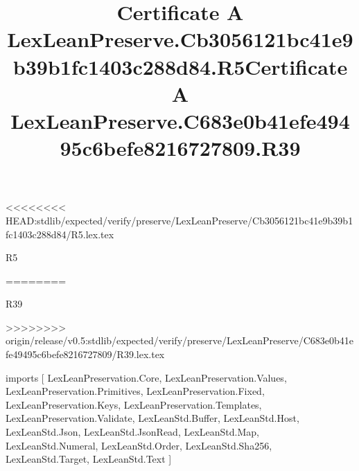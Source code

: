 <<<<<<<< HEAD:stdlib/expected/verify/preserve/LexLeanPreserve/Cb3056121bc41e9b39b1fc1403c288d84/R5.lex.tex
\begin{lexlean}{R5}
\title{Certificate A LexLeanPreserve.Cb3056121bc41e9b39b1fc1403c288d84.R5}
========
\begin{lexlean}{R39}
\title{Certificate A LexLeanPreserve.C683e0b41efe49495c6befe8216727809.R39}
>>>>>>>> origin/release/v0.5:stdlib/expected/verify/preserve/LexLeanPreserve/C683e0b41efe49495c6befe8216727809/R39.lex.tex
\begin{coremodule}
imports [
  LexLeanPreservation.Core,
  LexLeanPreservation.Values,
  LexLeanPreservation.Primitives,
  LexLeanPreservation.Fixed,
  LexLeanPreservation.Keys,
  LexLeanPreservation.Templates,
  LexLeanPreservation.Validate,
  LexLeanStd.Buffer,
  LexLeanStd.Host,
  LexLeanStd.Json,
  LexLeanStd.JsonRead,
  LexLeanStd.Map,
  LexLeanStd.Numeral,
  LexLeanStd.Order,
  LexLeanStd.Sha256,
  LexLeanStd.Target,
  LexLeanStd.Text
]


\end{coremodule}
\end{lexlean}
\end{lexlean}
